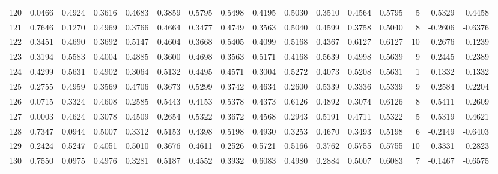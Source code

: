\begin{tabular}{lrrrrrrrrrrrrrrr}
120 &      0.0466 &  0.4924 &  0.3616 &  0.4683 &  0.3859 &  0.5795 &  0.5498 &  0.4195 &  0.5030 &  0.3510 &   0.4564 &     0.5795 &      5 &                    0.5329 &                     0.4458 \\
121 &      0.7646 &  0.1270 &  0.4969 &  0.3766 &  0.4664 &  0.3477 &  0.4749 &  0.3563 &  0.5040 &  0.4599 &   0.3758 &     0.5040 &      8 &                   -0.2606 &                    -0.6376 \\
122 &      0.3451 &  0.4690 &  0.3692 &  0.5147 &  0.4604 &  0.3668 &  0.5405 &  0.4099 &  0.5168 &  0.4367 &   0.6127 &     0.6127 &     10 &                    0.2676 &                     0.1239 \\
123 &      0.3194 &  0.5583 &  0.4004 &  0.4885 &  0.3600 &  0.4698 &  0.3563 &  0.5171 &  0.4168 &  0.5639 &   0.4998 &     0.5639 &      9 &                    0.2445 &                     0.2389 \\
124 &      0.4299 &  0.5631 &  0.4902 &  0.3064 &  0.5132 &  0.4495 &  0.4571 &  0.3004 &  0.5272 &  0.4073 &   0.5208 &     0.5631 &      1 &                    0.1332 &                     0.1332 \\
125 &      0.2755 &  0.4959 &  0.3569 &  0.4706 &  0.3673 &  0.5299 &  0.3742 &  0.4634 &  0.2600 &  0.5339 &   0.3336 &     0.5339 &      9 &                    0.2584 &                     0.2204 \\
126 &      0.0715 &  0.3324 &  0.4608 &  0.2585 &  0.5443 &  0.4153 &  0.5378 &  0.4373 &  0.6126 &  0.4892 &   0.3074 &     0.6126 &      8 &                    0.5411 &                     0.2609 \\
127 &      0.0003 &  0.4624 &  0.3078 &  0.4509 &  0.2654 &  0.5322 &  0.3672 &  0.4568 &  0.2943 &  0.5191 &   0.4711 &     0.5322 &      5 &                    0.5319 &                     0.4621 \\
128 &      0.7347 &  0.0944 &  0.5007 &  0.3312 &  0.5153 &  0.4398 &  0.5198 &  0.4930 &  0.3253 &  0.4670 &   0.3493 &     0.5198 &      6 &                   -0.2149 &                    -0.6403 \\
129 &      0.2424 &  0.5247 &  0.4051 &  0.5010 &  0.3676 &  0.4611 &  0.2526 &  0.5721 &  0.5166 &  0.3762 &   0.5755 &     0.5755 &     10 &                    0.3331 &                     0.2823 \\
130 &      0.7550 &  0.0975 &  0.4976 &  0.3281 &  0.5187 &  0.4552 &  0.3932 &  0.6083 &  0.4980 &  0.2884 &   0.5007 &     0.6083 &      7 &                   -0.1467 &                    -0.6575 \\

\end{tabular}

